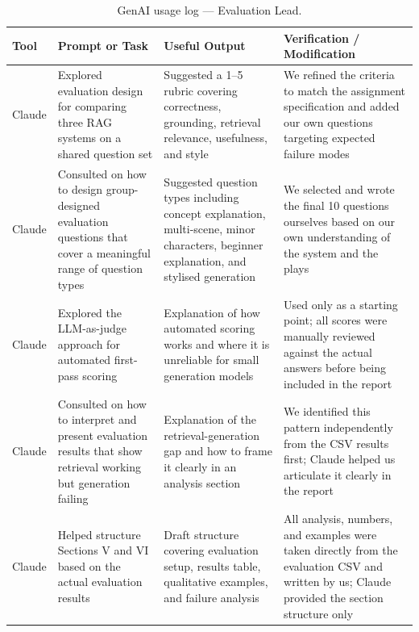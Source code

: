 \documentclass[10pt,conference]{IEEEtran}
\begin{document}
\begin{table}[p]
\centering
\caption{GenAI usage log --- Evaluation Lead.}
\label{tab:genai-log-varshu}
\begin{tabularx}{\textwidth}{p{1.5cm} p{3.5cm} p{3.5cm} X}
\toprule
Tool & Prompt or Task & Useful Output & Verification / Modification \\
\midrule

Claude &
Explored evaluation design for comparing three RAG systems on a
shared question set &
Suggested a 1--5 rubric covering correctness, grounding, retrieval
relevance, usefulness, and style &
We refined the criteria to match the assignment specification and
added our own questions targeting expected failure modes \\

Claude &
Consulted on how to design group-designed evaluation questions that
cover a meaningful range of question types &
Suggested question types including concept explanation, multi-scene,
minor characters, beginner explanation, and stylised generation &
We selected and wrote the final 10 questions ourselves based on our
own understanding of the system and the plays \\

Claude &
Explored the LLM-as-judge approach for automated first-pass scoring &
Explanation of how automated scoring works and where it is
unreliable for small generation models &
Used only as a starting point; all scores were manually reviewed
against the actual answers before being included in the report \\

Claude &
Consulted on how to interpret and present evaluation results that
show retrieval working but generation failing &
Explanation of the retrieval-generation gap and how to frame it
clearly in an analysis section &
We identified this pattern independently from the CSV results first;
Claude helped us articulate it clearly in the report \\

Claude &
Helped structure Sections V and VI based on the actual evaluation
results &
Draft structure covering evaluation setup, results table, qualitative
examples, and failure analysis &
All analysis, numbers, and examples were taken directly from the
evaluation CSV and written by us; Claude provided the section
structure only \\

\bottomrule
\end{tabularx}
\end{table}
\end{document}
